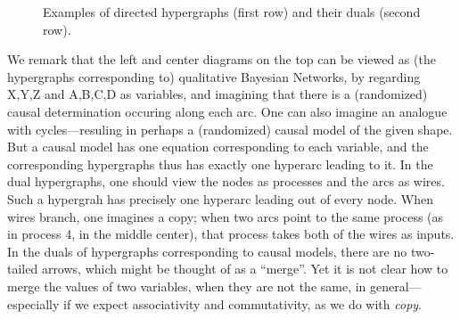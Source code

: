 \begin{figure}
    \hfill
    \caption{Examples of directed hypergraphs (first row) and their duals (second row).}
        \label{fig:dhygraph-duals}
\end{figure}%
We remark that
the left and center diagrams on the top can be viewed as (the hypergraphs corresponding to) qualitative Bayesian Networks, by regarding X,Y,Z and A,B,C,D as variables, and imagining that there is a (randomized) causal determination occuring along each arc. 
One can also imagine an analogue with cycles---resuling in perhaps a (randomized) causal model of the given shape.  But a causal model has one equation corresponding to each variable, and the corresponding hypergraphs thus has exactly one hyperarc leading to it. 
In the dual hypergraphs, one should view the nodes as processes and the arcs as wires. Such a hypergrah has precisely one hyperarc leading out of every node. When wires branch, one imagines a copy; when two arcs point to the same process (as in process 4, in the middle center), that process takes both of the wires as inputs.
In the duals of hypergraphs corresponding to causal models, there are no two-tailed arrows, which might be thought of as a ``merge''. 
Yet it is not clear how to merge the values of two variables, when they are not the same, in general---especially if we expect associativity and commutativity, as we do with \emph{copy}. 

